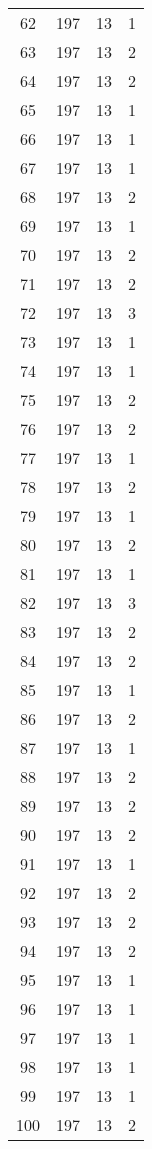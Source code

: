 \begin{longtable}[!]{c|ccc}
	62	& 197	& 13	& 1	\\
	63	& 197	& 13	& 2	\\
	64	& 197	& 13	& 2	\\
	65	& 197	& 13	& 1	\\
	66	& 197	& 13	& 1	\\
	67	& 197	& 13	& 1	\\
	68	& 197	& 13	& 2	\\
	69	& 197	& 13	& 1	\\
	70	& 197	& 13	& 2	\\
	71	& 197	& 13	& 2	\\
	72	& 197	& 13	& 3	\\
	73	& 197	& 13	& 1	\\
	74	& 197	& 13	& 1	\\
	75	& 197	& 13	& 2	\\
	76	& 197	& 13	& 2	\\
	77	& 197	& 13	& 1	\\
	78	& 197	& 13	& 2	\\
	79	& 197	& 13	& 1	\\
	80	& 197	& 13	& 2	\\
	81	& 197	& 13	& 1	\\
	82	& 197	& 13	& 3	\\
	83	& 197	& 13	& 2	\\
	84	& 197	& 13	& 2	\\
	85	& 197	& 13	& 1	\\
	86	& 197	& 13	& 2	\\
	87	& 197	& 13	& 1	\\
	88	& 197	& 13	& 2	\\
	89	& 197	& 13	& 2	\\
	90	& 197	& 13	& 2	\\
	91	& 197	& 13	& 1	\\
	92	& 197	& 13	& 2	\\
	93	& 197	& 13	& 2	\\
	94	& 197	& 13	& 2	\\
	95	& 197	& 13	& 1	\\
	96	& 197	& 13	& 1	\\
	97	& 197	& 13	& 1	\\
	98	& 197	& 13	& 1	\\
	99	& 197	& 13	& 1	\\
	100	& 197	& 13	& 2	\\
\end{longtable}


